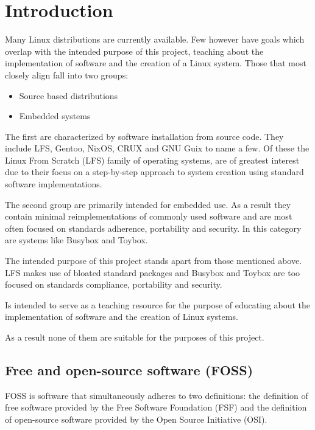 \section{Introduction}\label{Introduction}

Many Linux distributions are currently available. Few however have goals which overlap with the intended purpose of this project, teaching about the implementation of software and the creation of a Linux system. Those that most closely align fall into two groups:

\begin{itemize}
    \item Source based distributions
    \item Embedded systems
\end{itemize}

The first are characterized by software installation from source code. They include LFS, Gentoo, NixOS, CRUX and GNU Guix to name a few. Of these the Linux From Scratch (LFS) family of operating systems, are of greatest interest due to their focus on a step-by-step approach to system creation using standard software implementations. 

The second group are primarily intended for embedded use. As a result they contain minimal reimplementations of commonly used software and are most often focused on standards adherence, portability and security. In this category are systems like Busybox and Toybox.

The intended purpose of this project stands apart from those mentioned above. LFS makes use of bloated standard packages and Busybox and Toybox are too focused on standards compliance, portability and security.

Is intended to serve as a teaching resource for the purpose of educating about the implementation of software and the creation of Linux systems.

As a result none of them are suitable for the purposes of this project.

\subsection{Free and open-source software (FOSS)}

FOSS is software that simultaneously adheres to two definitions: the definition of free software provided by the Free Software Foundation (FSF) and the definition of open-source software provided by the Open Source Initiative (OSI).

